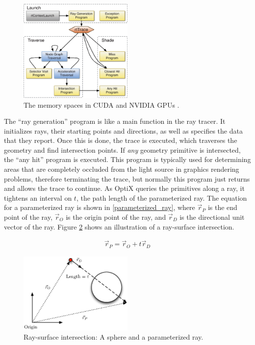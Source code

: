 \begin{figure}[h!] 
  \centering
    \includegraphics[width=0.5\textwidth]{graphics/optix_flow.eps}
     \caption{The memory spaces in CUDA and NVIDIA GPUs \cite{optix_paper}. \label{optix_flow}}
\end{figure}

The ``ray generation'' program is like a main function in the ray tracer. It initializes rays, their starting points and directions, as well as specifies the data that they report.  Once this is done, the trace is executed, which traverses the geometry and find intersection points.  If \emph{any} geometry primitive is intersected, the ``any hit'' program is executed.  This program is typically used for determining areas that are completely occluded from the light source in graphics rendering problems, therefore terminating the trace, but normally this program just returns and allows the trace to continue.  As OptiX queries the primitives along a ray, it tightens an interval on $t$, the path length of the parameterized ray.  The equation for a parameterized ray is shown in \eqref{parameterized_ray}, where $\vec{r}_P$ is the end point of the ray, $\vec{r}_O$ is the origin point of the ray, and $\vec{r}_D$ is the directional unit vector of the ray.  Figure \ref{ray_surface} shows an illustration of a ray-surface intersection.

\begin{equation}
\label{parameterized_ray}
\begin{split}
\vec{r}_P = \vec{r}_O + t \vec{r}_D 
\end{split}
\end{equation}

\begin{figure}[h!] 
  \centering
    \includegraphics[width=0.5\textwidth]{graphics/ray_surface.eps}
     \caption{Ray-surface intersection:  A sphere and a parameterized ray. \label{ray_surface}}
\end{figure}

